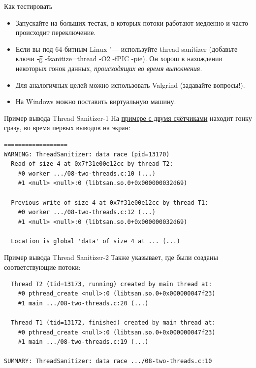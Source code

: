 \begin{frame}{Как тестировать}
	\begin{itemize}
		\item Запускайте на больших тестах, в которых потоки работают медленно и часто происходит переключение.
		\item
			Если вы под 64-битным Linux "--- используйте thread sanitizer (добавьте ключи \t{-g -fsanitize=thread -O2 -fPIC -pie}).
			Он хорош в нахождении некоторых гонок данных, \textit{происходящих во время выполнения}.
		\item
			Для аналогичных целей можно использовать Valgrind (задавайте вопросы!).
		\item
			На Windows можно поставить виртуальную машину.
	\end{itemize}
\end{frame}

\begin{frame}[fragile]{Пример вывода Thread Sanitizer-1}
	На \href{https://github.com/yeputons/fall-2017-paradigms/raw/master/171023/sources/08-two-threads.cpp}{примере с двумя счётчиками} находит гонку сразу,
	во время первых выводов на экран:
\begin{verbatim}
==================
WARNING: ThreadSanitizer: data race (pid=13170)
  Read of size 4 at 0x7f31e00e12cc by thread T2:
    #0 worker .../08-two-threads.c:10 (...)
    #1 <null> <null>:0 (libtsan.so.0+0x000000032d69)

  Previous write of size 4 at 0x7f31e00e12cc by thread T1:
    #0 worker .../08-two-threads.c:12 (...)
    #1 <null> <null>:0 (libtsan.so.0+0x000000032d69)

  Location is global 'data' of size 4 at ... (...)
\end{verbatim}
\end{frame}

\begin{frame}[fragile]{Пример вывода Thread Sanitizer-2}
	Также указывает, где были созданы соответствующие потоки:
\begin{verbatim}
  Thread T2 (tid=13173, running) created by main thread at:
    #0 pthread_create <null>:0 (libtsan.so.0+0x000000047f23)
    #1 main .../08-two-threads.c:20 (...)

  Thread T1 (tid=13172, finished) created by main thread at:
    #0 pthread_create <null>:0 (libtsan.so.0+0x000000047f23)
    #1 main .../08-two-threads.c:19 (...)

SUMMARY: ThreadSanitizer: data race .../08-two-threads.c:10
\end{verbatim}
\end{frame}
